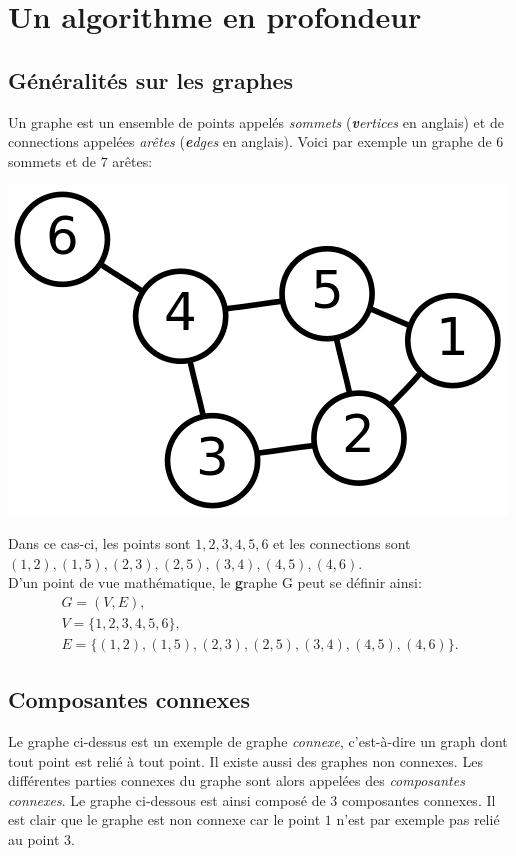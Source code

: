 \section{Un algorithme en profondeur}
\subsection{Généralités sur les graphes}

Un graphe est un ensemble de points appelés \textit{sommets} (\textit{\textbf{v}ertices} en anglais) et de connections appelées \textit{arêtes} (\textit{\textbf{e}dges} en anglais). Voici par exemple un graphe de $6$ sommets et de $7$ arêtes:

\begin{center}
\includegraphics[width=0.5\linewidth]{images/graph.png}
\end{center}

Dans ce cas-ci, les points sont $1, 2, 3, 4, 5, 6$ et les connections sont \\ $(1,2),(1,5),(2,3),(2,5),(3,4),(4,5),(4,6)$. \\
D'un point de vue mathématique, le \textbf{g}raphe G peut se définir ainsi: 
$$\begin{array}{l}
G = (V, E), \\
V = \{1,2,3,4,5,6\}, \\
E = \{(1,2),(1,5),(2,3),(2,5),(3,4),(4,5),(4,6)\}.
\end{array}$$


\subsection{Composantes connexes}
Le graphe ci-dessus est un exemple de graphe \textit{connexe}, c'est-à-dire un graph dont tout point est relié à tout point. Il existe aussi des graphes non connexes. Les différentes parties connexes du graphe sont alors appelées des \textit{composantes connexes}. Le graphe ci-dessous est ainsi composé de $3$ composantes connexes. Il est clair que le graphe est non connexe car le point $1$ n'est par exemple pas relié au point $3$.

